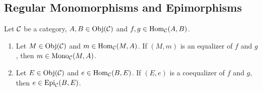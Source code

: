 \documentclass{book}
\begin{document}
	
	
	
	
	
	
	
	
	\subsection{Regular Monomorphisms and Epimorphisms}
	
	\begin{ex}
		Let $\mathcal{C}$ be a category, $A,B \in \operatorname{Obj}(\mathcal{C})$ and $f,g \in \operatorname{Hom}_{\mathcal{C}}(A,B)$.
		\begin{enumerate}
			\item Let $M \in \operatorname{Obj}(\mathcal{C})$ and $m \in \operatorname{Hom}_{\mathcal{C}}(M, A)$. If $(M, m)$ is an equalizer of $f$ and $g$, then $m \in \operatorname{Mono}_{\mathcal{C}}(M, A)$. 
			\item Let $E \in \operatorname{Obj}(\mathcal{C})$ and $e \in \operatorname{Hom}_{\mathcal{C}}(B, E)$. If $(E, e)$ is a coequalizer of $f$ and $g$, then $e \in \operatorname{Epi}_{\mathcal{C}}(B, E)$. 
		\end{enumerate}
	\end{ex}
	
\end{document}
